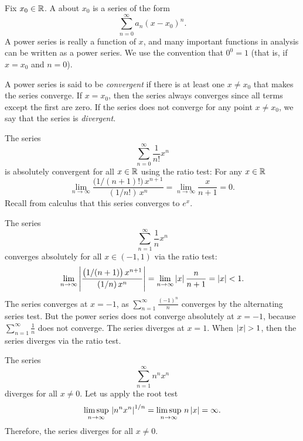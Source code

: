 Fix $x_0 \in {\mathbb{R}}$.
A \emph{} about $x_0$
is a series of the form
\begin{equation*}
\sum_{n=0}^\infty a_n {(x-x_0)}^n .
\end{equation*}
A power series is really a function of $x$, and
many important functions in analysis can be written
as a power series.  We use the convention that
$0^0 = 1$ (that is, if $x=x_0$ and $n=0$).

A power series is said to be
\emph{convergent} if
there is at least one $x \not= x_0$ that makes the series converge.
If $x=x_0$, then the series always
converges since all terms except the first are zero.
If the series does not converge for any point $x \not= x_0$, we say that
the series is \emph{divergent}.

\begin{example} \label{ps:expex}
The series
\begin{equation*}
\sum_{n=0}^\infty \frac{1}{n!} x^n
\end{equation*}
is absolutely convergent for all $x \in {\mathbb{R}}$ using the ratio test:
For any $x \in {\mathbb{R}}$
\begin{equation*}
\lim_{n \to \infty}
\frac{\bigl(1/(n+1)!\bigr) \, x^{n+1}}{(1/n!) \, x^{n}}
=
\lim_{n \to \infty}
\frac{x}{n+1}
=
0.
\end{equation*}
Recall from calculus that this series converges to $e^x$.
\end{example}

\begin{example} \label{ps:1kex}
The series
\begin{equation*}
\sum_{n=1}^\infty \frac{1}{n} x^n
\end{equation*}
converges absolutely for all $x \in (-1,1)$ via the ratio test:
\begin{equation*}
\lim_{n \to \infty}
\left\lvert {
\frac{\bigl(1/(n+1) \bigr) \, x^{n+1}}{(1/n) \, x^{n}}
} \right\rvert
=
\lim_{n \to \infty}
\left\lvert {x} \right\rvert \frac{n}{n+1}
=
\left\lvert {x} \right\rvert < 1 .
\end{equation*}
The series converges at $x=-1$,
as
$\sum_{n=1}^\infty \frac{{(-1)}^n}{n}$ converges
by the alternating series
test.
But the power series does not converge absolutely at $x=-1$, because
$\sum_{n=1}^\infty \frac{1}{n}$ does not converge.
The series
diverges at $x=1$.
When $\left\lvert {x} \right\rvert > 1$, then the series diverges via the ratio test.
\end{example}

\begin{example} \label{ps:divergeex}
The series
\begin{equation*}
\sum_{n=1}^\infty n^n x^n
\end{equation*}
diverges for all $x \not= 0$.  Let us apply the root test
\begin{equation*}
\limsup_{n\to\infty}
\,
\left\lvert {n^n x^n} \right\rvert^{1/n}
=
\limsup_{n\to\infty}
\,
n \left\lvert {x} \right\rvert
= \infty .
\end{equation*}
Therefore, the series diverges for all $x \not= 0$.
\end{example}

